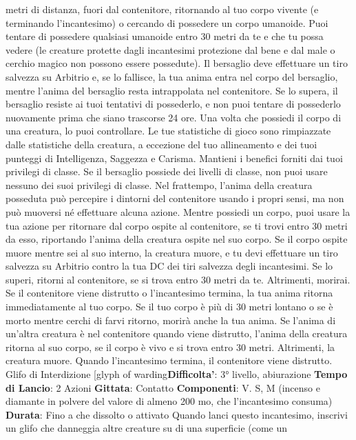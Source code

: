 \begin{multicols}{2}
metri di distanza, fuori dal contenitore, ritornando al tuo
corpo vivente (e terminando l’incantesimo) o cercando
di possedere un corpo umanoide.
Puoi tentare di possedere qualsiasi umanoide entro 30
metri da te e che tu possa vedere (le creature protette
dagli incantesimi protezione dal bene e dal male o
cerchio magico non possono essere possedute). Il
bersaglio deve effettuare un tiro salvezza su Arbitrio e,
se lo fallisce, la tua anima entra nel corpo del bersaglio,
mentre l’anima del bersaglio resta intrappolata nel
contenitore. Se lo supera, il bersaglio resiste ai tuoi
tentativi di possederlo, e non puoi tentare di possederlo
nuovamente prima che siano trascorse 24 ore.
Una volta che possiedi il corpo di una creatura, lo puoi
controllare. Le tue statistiche di gioco sono rimpiazzate
dalle statistiche della creatura, a eccezione del tuo
allineamento e dei tuoi punteggi di Intelligenza,
Saggezza e Carisma. Mantieni i benefici forniti dai tuoi
privilegi di classe. Se il bersaglio possiede dei livelli di
classe, non puoi usare nessuno dei suoi privilegi di
classe.
Nel frattempo, l’anima della creatura posseduta può
percepire i dintorni del contenitore usando i propri
sensi, ma non può muoversi né effettuare alcuna
azione.
Mentre possiedi un corpo, puoi usare la tua azione per
ritornare dal corpo ospite al contenitore, se ti trovi entro
30 metri da esso, riportando l’anima della creatura
ospite nel suo corpo. Se il corpo ospite muore mentre
sei al suo interno, la creatura muore, e tu devi effettuare
un tiro salvezza su Arbitrio contro la tua DC dei tiri
salvezza degli incantesimi. Se lo superi, ritorni al
contenitore, se si trova entro 30 metri da te. Altrimenti,
morirai.
Se il contenitore viene distrutto o l’incantesimo termina,
la tua anima ritorna immediatamente al tuo corpo. Se il
tuo corpo è più di 30 metri lontano o se è morto mentre
cerchi di farvi ritorno, morirà anche la tua anima. Se
l’anima di un’altra creatura è nel contenitore quando
viene distrutto, l’anima della creatura ritorna al suo
corpo, se il corpo è vivo e si trova entro 30 metri.
Altrimenti, la creatura muore.
Quando l’incantesimo termina, il contenitore viene
distrutto.
Glifo di Interdizione
[glyph of warding\textbf{Difficolta'}:
3° livello, abiurazione
\textbf{Tempo di Lancio}: 2 Azioni
\textbf{Gittata}: Contatto
\textbf{Componenti}: V. S, M (incenso e diamante in polvere
del valore di almeno 200 mo, che l’incantesimo
consuma)
\textbf{Durata}: Fino a che dissolto o attivato
Quando lanci questo incantesimo, inscrivi un glifo che
danneggia altre creature su di una superficie (come un

\end{multicols}

